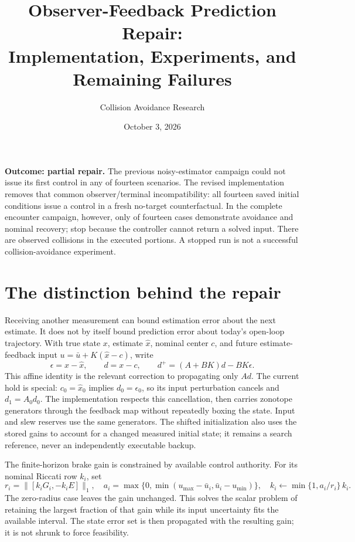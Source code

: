 \documentclass[11pt]{article}
\title{Observer-Feedback Prediction Repair:\\Implementation, Experiments, and Remaining Failures}
\author{Collision Avoidance Research}
\date{October 3, 2026}
\begin{document}
\maketitle


\textbf{Outcome: partial repair.} The previous noisy-estimator campaign could
not issue its first control in any of fourteen scenarios. The revised
implementation removes that common observer/terminal incompatibility:
all fourteen saved initial conditions issue a control in a fresh no-target
counterfactual. In the complete encounter campaign, however, only
\recoveredCases{} of fourteen cases demonstrate avoidance and nominal recovery;
\unavailableCases{} stop because the controller cannot return a solved input.
There are \collisionCases{} observed collisions in the executed portions.
A stopped run is not a successful collision-avoidance experiment.

\section{The distinction behind the repair}
Receiving another measurement can bound estimation error about the next
estimate. It does not by itself bound prediction error about today's
open-loop trajectory. With true state $x$, estimate $\hat x$, nominal center
$c$, and future estimate-feedback input
$u=\bar u+K(\hat x-c)$, write
\[
 \epsilon=x-\hat x,\qquad d=x-c,\qquad
 d^+=(A+BK)d-BK\epsilon.
\]
This affine identity is the relevant correction to propagating only $Ad$.
The current hold is special: $c_0=\hat x_0$ implies $d_0=\epsilon_0$,
so its input perturbation cancels and $d_1=A_0d_0$.
The implementation respects this cancellation, then carries zonotope
generators through the feedback map without repeatedly boxing the state.
Input and slew reserves use the same generators. The shifted initialization
also uses the stored gains to account for a changed measured initial state;
it remains a search reference, never an independently executable backup.

The finite-horizon brake gain is constrained by available control authority.
For its nominal Riccati row $k_i$, set
\[
 r_i=\|[k_iG_i,-k_iE]\|_1,\quad
 a_i=\max\{0,\min(u_{\max}-\bar u_i,\bar u_i-u_{\min})\},\quad
 k_i\leftarrow\min\{1,a_i/r_i\}\,k_i.
\]
The zero-radius case leaves the gain unchanged. This solves the scalar
problem of retaining the largest fraction of that gain while its input
uncertainty fits the available interval. The state error set is then
propagated with the resulting gain; it is not shrunk to force feasibility.
\end{document}
